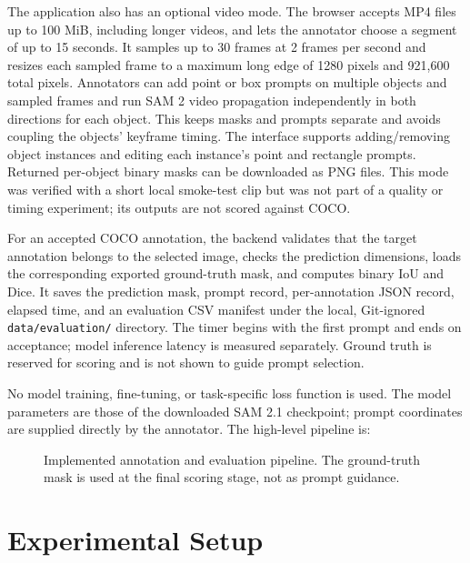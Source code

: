 \documentclass[11pt]{article}
\begin{document}
The application also has an optional video mode. The browser accepts MP4 files
up to 100 MiB, including longer videos, and lets the annotator choose a segment
of up to 15 seconds. It samples up to 30 frames at 2 frames per second and
resizes each sampled frame to a maximum long edge of 1280 pixels and
921,600 total pixels. Annotators can add point or box prompts on multiple
objects and sampled frames and run SAM 2 video propagation independently in
both directions for each object. This keeps masks and prompts separate and
avoids coupling the objects' keyframe timing.
The interface supports adding/removing object instances and editing each
instance's point and rectangle prompts. Returned per-object binary masks can
be downloaded as PNG files. This mode was
verified with a short local smoke-test clip but was not part of a quality or
timing experiment; its outputs are not scored against COCO.

For an accepted COCO annotation, the backend validates that the target
annotation belongs to the selected image, checks the prediction dimensions,
loads the corresponding exported ground-truth mask, and computes binary IoU
and Dice. It saves the prediction mask, prompt record, per-annotation JSON
record, elapsed time, and an evaluation CSV manifest under the local,
Git-ignored \texttt{data/evaluation/} directory. The timer begins with the
first prompt and ends on acceptance; model inference latency is measured
separately. Ground truth is reserved for scoring and is not shown to guide
prompt selection.

No model training, fine-tuning, or task-specific loss function is used. The
model parameters are those of the downloaded SAM 2.1 checkpoint; prompt
coordinates are supplied directly by the annotator. The high-level pipeline
is:

\begin{figure}[ht]
\centering
{}
\caption{Implemented annotation and evaluation pipeline. The ground-truth
mask is used at the final scoring stage, not as prompt guidance.}
\label{fig:arch}
\end{figure}

\section{Experimental Setup}
\label{sec:setup}
\end{document}
